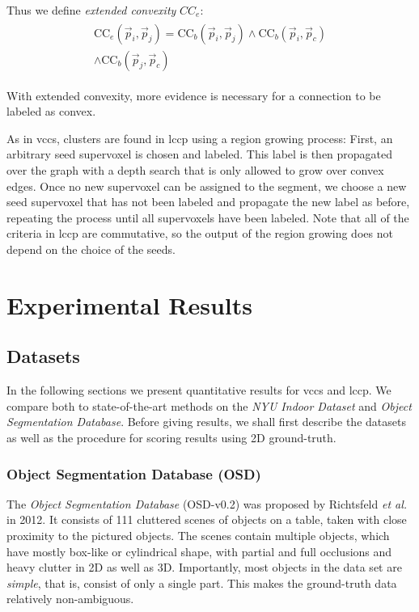 Thus we define \textit{extended convexity} $CC_e$:
\begin{align}
  \begin{aligned}
   \text{CC}_e (\vec p_i, \vec p_j) = \text{CC}_b(\vec p_i, \vec p_j) \land \text{CC}_b(\vec p_i, \vec p_c) \\ \land \text{CC}_b(\vec p_j, \vec p_c)
  \end{aligned}
\end{align}

With extended convexity, more evidence is necessary for a connection to be labeled as convex. 

As in \gls{vccs}, clusters are found in \gls{lccp} using a region growing process: First, an arbitrary seed supervoxel is chosen and labeled. This label is then propagated over the graph with a depth search that is only allowed to grow over convex edges. Once no new supervoxel can be assigned to the segment, we choose a new seed supervoxel that has not been labeled and propagate the new label as before, repeating the process until all supervoxels have been labeled. Note that all of the criteria in \gls{lccp} are commutative, so the output of the region growing does not depend on the choice of the seeds.

\section{Experimental Results}
\subsection{Datasets}
In the following sections we present quantitative results for \gls{vccs} and \gls{lccp}. We compare both to state-of-the-art methods on the \textit{NYU Indoor Dataset}\cite{Silberman:ECCV12} and \textit{Object Segmentation Database}\cite{Richtsfeld:IROS12}. Before giving results, we shall first describe the datasets as well as the procedure for scoring results using 2D ground-truth.

\subsubsection{Object Segmentation Database (OSD)}
The \textit{Object Segmentation Database} (OSD-v0.2) was proposed by Richtsfeld \textit{et al.}\cite{Richtsfeld:IROS12} in 2012. It consists of 111 cluttered scenes of objects on a table, taken with close proximity to the pictured objects. The scenes contain multiple objects, which have mostly box-like or cylindrical shape, with partial and full occlusions and heavy clutter in 2D as well as 3D. Importantly, most objects in the data set are \textit{simple}, that is, consist of only a single part. This makes the ground-truth data relatively non-ambiguous.

